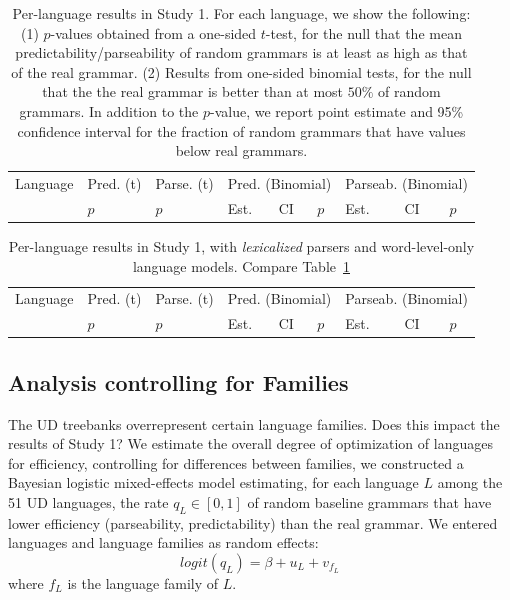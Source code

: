 \documentclass[10pt,twoside,lineno]{article}
\begin{document}
\begin{table}
\centering
\small{
\begin{tabular}{l||ll|lll|lll}
Language & Pred. (t) & Parse. (t) & \multicolumn{3}{c|}{Pred. (Binomial)} & \multicolumn{3}{c}{Parseab. (Binomial)} \\ 
&  $p$ & $p$ &  Est. &CI & $p$ & Est. & CI & $p$  \\ \hline \hline

\end{tabular}
}
\caption{Per-language results in Study 1. For each language, we show the following: (1) $p$-values obtained from a one-sided $t$-test, for the null that the mean predictability/parseability of random grammars is at least as high as that of the real grammar. (2) Results from one-sided binomial tests, for the null that the the real grammar is better than at most $50 \%$ of random grammars. In addition to the $p$-value, we report point estimate and 95\% confidence interval for the fraction of random grammars that have values below real grammars.}\label{fig:pareto-per-lang-stats}
\end{table}



\begin{table}
\centering
\small{
\begin{tabular}{l||ll|lll|lll}
Language & Pred. (t) & Parse. (t) & \multicolumn{3}{c|}{Pred. (Binomial)} & \multicolumn{3}{c}{Parseab. (Binomial)} \\ 
&  $p$ & $p$ &  Est. &CI & $p$ & Est. & CI & $p$  \\ \hline \hline

\end{tabular}
}
	\caption{Per-language results in Study 1, with \emph{lexicalized} parsers and word-level-only language models. Compare Table~\ref{fig:pareto-per-lang-stats}}
\end{table}


\subsection{Analysis controlling for Families}

The UD treebanks overrepresent certain language families.
Does this impact the results of Study 1?
We estimate the overall degree of optimization of languages for efficiency, controlling for differences between families, we constructed a Bayesian logistic mixed-effects model estimating, for each language $L$ among the 51 UD languages, the rate $q_L \in [0,1]$ of random baseline grammars that have lower efficiency (parseability, predictability) than the real grammar.
We entered languages and language families as random effects:
\begin{equation}\label{eq:mixed-effects-study1}
logit(q_{L}) = \beta + u_{L} + v_{f_L}
\end{equation}
where $f_L$ is the language family of $L$.
\end{document}
